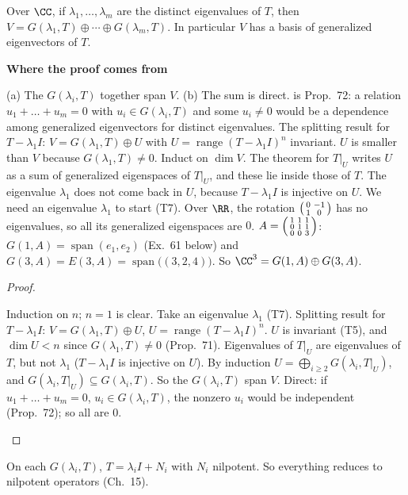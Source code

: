 \documentclass[10pt]{scrartcl}
\DeclareMathOperator{\range}{range}
\DeclareMathOperator{\spn}{span}
\newenvironment{motive}{\begin{mdframed}[style=thinkbox]\textbf{\color{OliveGreen!75!black}Where the proof comes from}\begin{description}[leftmargin=0.9em,labelindent=0pt,itemsep=2pt,topsep=2pt,font=\normalfont\bfseries\color{OliveGreen!70!black}]}{\end{description}\end{mdframed}}
\newenvironment{steps}{\begin{enumerate}[label=\arabic*.,leftmargin=1.5em,itemsep=2pt,topsep=2pt]}{\end{enumerate}}
\begin{document}
\begin{theorem*}
  Over $\CC$, if $\lambda_1,\dots,\lambda_m$ are the distinct eigenvalues of $T$, then $V=G(\lambda_1,T)\oplus\cdots\oplus G(\lambda_m,T)$. In particular $V$ has a basis of generalized eigenvectors of $T$.
\end{theorem*}
\begin{motive}
  \ii[Want.] (a) The $G(\lambda_i,T)$ together span $V$. (b) The sum is direct.
  \ii[(b)] is Prop.~72: a relation $u_1+\dots+u_m=0$ with $u_i\in G(\lambda_i,T)$ and some $u_i\ne0$ would be a dependence among generalized eigenvectors for distinct eigenvalues.
   The splitting result for $T-\lambda_1I$: $V=G(\lambda_1,T)\oplus U$ with $U=\range(T-\lambda_1I)^n$ invariant. $U$ is smaller than $V$ because $G(\lambda_1,T)\ne0$.
   Induct on $\dim V$. The theorem for $T|_U$ writes $U$ as a sum of generalized eigenspaces of $T|_U$, and these lie inside those of $T$. The eigenvalue $\lambda_1$ does not come back in $U$, because $T-\lambda_1I$ is injective on $U$.
  \ii[Why $\CC$.] We need an eigenvalue $\lambda_1$ to start (T7). Over $\RR$, the rotation $\begin{psmallmatrix}0&-1\\1&0\end{psmallmatrix}$ has no eigenvalues, so all its generalized eigenspaces are $0$.
  \ii[Example.] $A=\begin{psmallmatrix}1&1&1\\0&1&1\\0&0&3\end{psmallmatrix}$: $G(1,A)=\spn(e_1,e_2)$ (Ex.~61 below) and $G(3,A)=E(3,A)=\spn\bigl((3,2,4)\bigr)$. So $\CC^3=G(1,A)\oplus G(3,A)$.
\end{motive}
\begin{proof}
  \begin{steps}
    \ii Induction on $n$; $n=1$ is clear. Take an eigenvalue $\lambda_1$ (T7).
    \ii Splitting result for $T-\lambda_1I$: $V=G(\lambda_1,T)\oplus U$, $U=\range(T-\lambda_1I)^n$. $U$ is invariant (T5), and $\dim U<n$ since $G(\lambda_1,T)\ne0$ (Prop.~71).
    \ii Eigenvalues of $T|_U$ are eigenvalues of $T$, but not $\lambda_1$ ($T-\lambda_1I$ is injective on $U$). By induction $U=\bigoplus_{i\ge2}G(\lambda_i,T|_U)$, and $G(\lambda_i,T|_U)\subseteq G(\lambda_i,T)$.
    \ii So the $G(\lambda_i,T)$ span $V$. Direct: if $u_1+\dots+u_m=0$, $u_i\in G(\lambda_i,T)$, the nonzero $u_i$ would be independent (Prop.~72); so all are $0$.
  \end{steps}
\end{proof}
On each $G(\lambda_i,T)$, $T=\lambda_iI+N_i$ with $N_i$ nilpotent. So everything reduces to nilpotent operators (Ch.~15).
\end{document}
